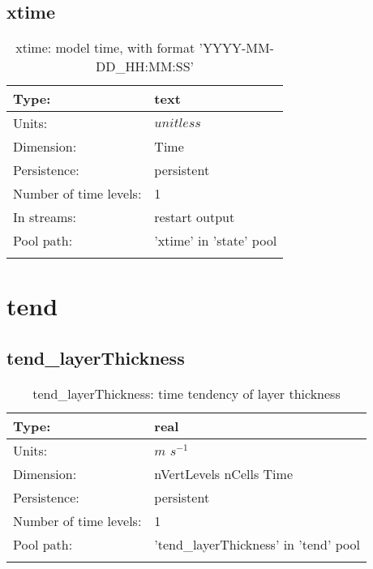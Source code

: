\subsection[xtime]{xtime}
\label{subsec:var_sec_state_xtime}
\begin{center}
\begin{longtable}{| p{2.0in} | p{4.0in} |}
        \hline 
        Type: & text \\
        \hline 
        Units: & $unitless$ \\
        \hline 
        Dimension: & Time \\
        \hline 
        Persistence: & persistent \\
        \hline 
        Number of time levels: & 1 \\
        \hline 
		 In streams: &  restart output \\
        \hline 
            Pool path: & 'xtime' in 'state' pool
 \\
		 \hline 
    \caption{xtime: model time, with format 'YYYY-MM-DD\_HH:MM:SS'}
\end{longtable}
\end{center}
\section[tend]{tend}
\label{sec:var_sec_tend}
\subsection[tend\_layerThickness]{tend\_layerThickness}
\label{subsec:var_sec_tend_tend_layerThickness}
\begin{center}
\begin{longtable}{| p{2.0in} | p{4.0in} |}
        \hline 
        Type: & real \\
        \hline 
        Units: & $m$ $s^{-1}$ \\
        \hline 
        Dimension: & nVertLevels nCells Time \\
        \hline 
        Persistence: & persistent \\
        \hline 
        Number of time levels: & 1 \\
        \hline 
            Pool path: & 'tend\_layerThickness' in 'tend' pool
 \\
		 \hline 
    \caption{tend\_layerThickness: time tendency of layer thickness}
\end{longtable}
\end{center}
